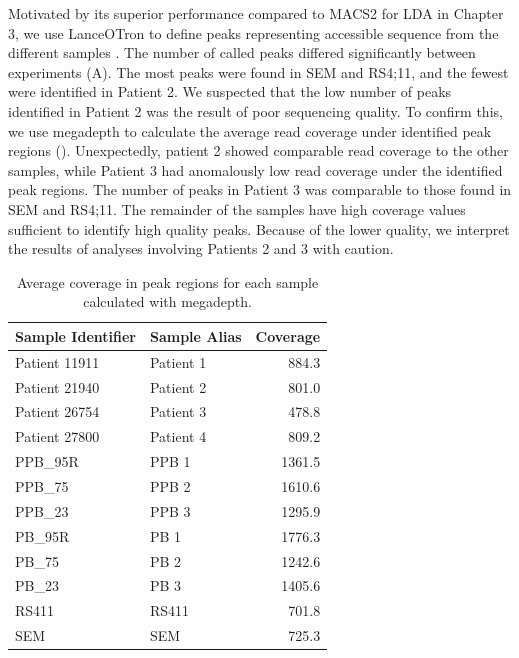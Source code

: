 Motivated by its superior performance compared to MACS2 for LDA in Chapter 3, we use LanceOTron to define peaks representing accessible sequence from the different samples \cite{Hentges2021}. The number of called peaks differed significantly between experiments (A). The most peaks were found in SEM and RS4;11, and the fewest were identified in Patient 2. We suspected that the low number of peaks identified in Patient 2 was the result of poor sequencing quality. To confirm this, we use megadepth to calculate the average read coverage under identified peak regions \cite{Wilks2021} (). Unexpectedly, patient 2 showed comparable read coverage to the other samples, while Patient 3 had anomalously low read coverage under the identified peak regions. The number of peaks in Patient 3 was comparable to those found in SEM and RS4;11. The remainder of the samples have high coverage values sufficient to identify high quality peaks. Because of the lower quality, we interpret the results of analyses involving Patients 2 and 3 with caution. 


\begin{table}[]
    \centering
    \begin{tabular}{@{}llr@{}}
    \toprule
    Sample Identifier & Sample Alias & Coverage \\ \midrule
    Patient 11911     & Patient 1    & 884.3                        \\
    Patient 21940     & Patient 2    & 801.0                        \\
    Patient 26754     & Patient 3    & 478.8                        \\
    Patient 27800     & Patient 4    & 809.2                        \\
    PPB\_95R          & PPB 1        & 1361.5                       \\
    PPB\_75           & PPB 2        & 1610.6                       \\
    PPB\_23           & PPB 3        & 1295.9                       \\
    PB\_95R           & PB 1         & 1776.3                       \\
    PB\_75            & PB 2         & 1242.6                       \\
    PB\_23            & PB 3         & 1405.6                       \\
    RS411             & RS411        & 701.8                        \\
    SEM               & SEM          & 725.3                        \\ \bottomrule
    \end{tabular}
    \caption{Average coverage in peak regions for each sample calculated with megadepth.}
    \label{table:mll_cov}
\end{table}

